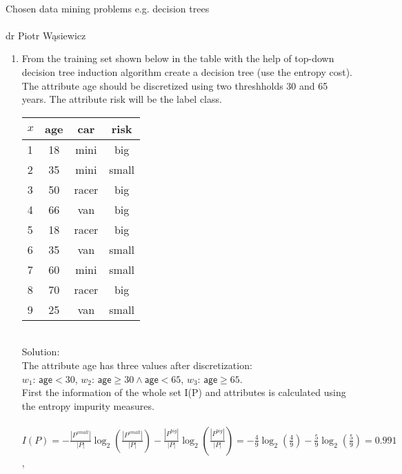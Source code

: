 \documentclass[10pt,a4paper]{article}
\begin{document}
\ \\
\Large
\begin{center}
{\sc Chosen data mining problems e.g. decision trees\/}
\ \\
\ \\
\Large
dr Piotr Wąsiewicz
\end{center}
\large
\begin{enumerate}
\item From the training set shown below in the table with the help of top-down decision tree induction algorithm create a decision tree (use the entropy cost). The attribute age should be discretized using two threshholds 30 and 65 years. The attribute risk will be the label class. 
\begin{center}
{\sf
   \begin{tabular}{|p{3mm}||c|c||c|}
   \hline 
   $x$ & age & car & risk\\
   \hline
   \hline
    1 & 18 & mini & big \\
   \hline
    2 & 35 & mini & small\\
   \hline
    3 & 50 & racer & big\\
   \hline
    4 & 66 & van & big\\
   \hline
    5 & 18 & racer & big\\
   \hline
    6 & 35 & van & small\\
   \hline
    7 & 60 & mini & small \\
   \hline
    8 & 70 & racer & big\\
   \hline
    9 & 25 & van & small\\
   \hline
   \end{tabular}
}
\end{center}
\ \\
{\sc Solution:\\}
The attribute {\sf age} has three values after discretization:\\
$w_1$: $\mathsf{age} < 30$,
$w_2$: $\mathsf{age} \ge 30\land \mathsf{age}<65$,
$w_3$: $\mathsf{age} \ge 65$.\\
First the information of the whole set I(P) and attributes is calculated using the entropy impurity measures.\\
\ \\
$\displaystyle I(P)=-\frac{|P^{small}|}{|P|}\log_2(\frac{|P^{small}|}{|P|})-\frac{|P^{big}|}{|P|}\log_2(\frac{|P^{big}|}{|P|})=-\frac{4}{9}\log_2(\frac{4}{9})-\frac{5}{9}\log_2(\frac{5}{9})=0.991$,\\

\end{enumerate}
\end{document}
